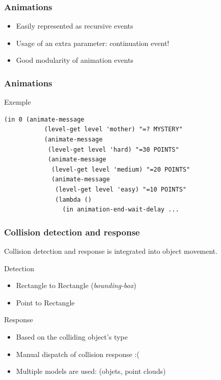 \documentclass{beamer}
\newcommand{\<}[1]{\`#1}
\begin{document}
\begin{frame}
  \frametitle{Animations}
  \begin{itemize}
  \item Easily represented as recursive events
  \item Usage of an extra parameter: \alert{continuation} event!
  \item Good modularity of animation events
  \end{itemize}
\end{frame}

\begin{frame}[fragile]
  \frametitle{Animations}
  \begin{block}{Exemple}
    \begin{lstlisting}[basicstyle=\footnotesize]
(in 0 (animate-message
           (level-get level 'mother) "=? MYSTERY"
           (animate-message
            (level-get level 'hard) "=30 POINTS"
            (animate-message
             (level-get level 'medium) "=20 POINTS"
             (animate-message
              (level-get level 'easy) "=10 POINTS"
              (lambda ()
                (in animation-end-wait-delay ...
    \end{lstlisting}
  \end{block}
\end{frame}

\begin{frame}
  \frametitle{Collision detection and response}

  Collision detection and response is integrated into object movement.

  \begin{block}{Detection}
    \begin{itemize}
    \item Rectangle to Rectangle (\textit{bounding-box})
    \item Point to Rectangle
    \end{itemize}
  \end{block}

  \begin{block}{Response}
    \begin{itemize}
    \item Based on the colliding object's \alert{type}
    \item Manual dispatch of collision response :(
    \item Multiple models are used: (objets, point clouds)
    \end{itemize}
  \end{block}
\end{frame}
\end{document}
